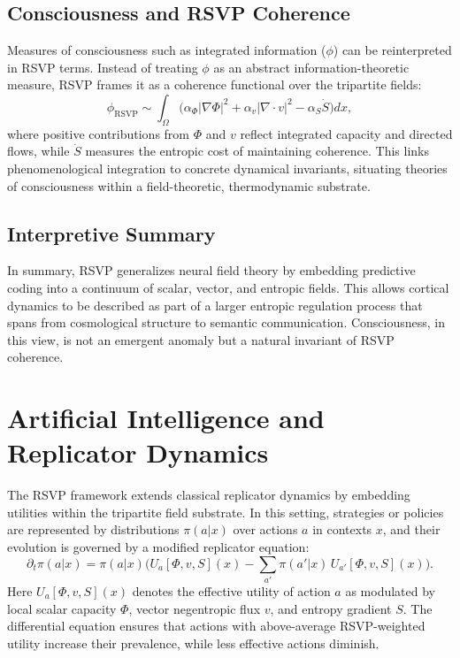\documentclass[12pt]{article}
\begin{document}
\subsection{Consciousness and RSVP Coherence}
Measures of consciousness such as integrated information ($\phi$) \cite{Oizumi2014,Tononi2012,Seth2016} can be reinterpreted in RSVP terms. Instead of treating $\phi$ as an abstract information-theoretic measure, RSVP frames it as a coherence functional over the tripartite fields:
\[
\phi_{\mathrm{RSVP}} \sim \int_\Omega \Big( \alpha_\Phi |\nabla \Phi|^2 + \alpha_v |\nabla \cdot v|^2 - \alpha_S \dot S \Big) dx,
\]
where positive contributions from $\Phi$ and $v$ reflect integrated capacity and directed flows, while $\dot S$ measures the entropic cost of maintaining coherence. This links phenomenological integration to concrete dynamical invariants, situating theories of consciousness within a field-theoretic, thermodynamic substrate.

\subsection{Interpretive Summary}
In summary, RSVP generalizes neural field theory by embedding predictive coding into a continuum of scalar, vector, and entropic fields. This allows cortical dynamics to be described as part of a larger entropic regulation process that spans from cosmological structure to semantic communication. Consciousness, in this view, is not an emergent anomaly but a natural invariant of RSVP coherence.

\section{Artificial Intelligence and Replicator Dynamics}

The RSVP framework extends classical replicator dynamics \cite{TaylorJonker1978,HofbauerSigmund1998,Nowak2006} by embedding utilities within the tripartite field substrate. In this setting, strategies or policies are represented by distributions $\pi(a|x)$ over actions $a$ in contexts $x$, and their evolution is governed by a modified replicator equation:
\begin{equation}
\partial_t \pi(a|x) = \pi(a|x)\Big( U_a[\Phi,v,S](x) - \sum_{a'} \pi(a'|x)\, U_{a'}[\Phi,v,S](x)\Big).
\end{equation}
Here $U_a[\Phi,v,S](x)$ denotes the effective utility of action $a$ as modulated by local scalar capacity $\Phi$, vector negentropic flux $v$, and entropy gradient $S$. The differential equation ensures that actions with above-average RSVP-weighted utility increase their prevalence, while less effective actions diminish.
\end{document}
